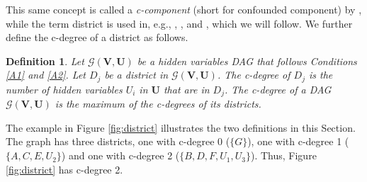 \documentclass[12pt]{article}
\newtheorem{definition}{Definition}
\newcommand{\bU}{\boldsymbol{U}}
\newcommand{\bV}{\boldsymbol{V}}
\begin{document}
This same concept is called a \emph{c-component} (short for confounded component) by \citet{tian2002testable}, while the term district is used in, e.g., \citet{richardson2003admgs}, \citet{evans2018margins}, and \citet {duarte2023automated}, which we will follow. We further define the c-degree of a district as follows.


\begin{definition}\label{def:cdeg}
Let $\mathcal{G}(\bV, \bU)$ be a hidden variables DAG that follows Conditions \ref{A1} and \ref{A2}. Let $D_j$ be a district in $\mathcal{G}(\bV, \bU)$. The \emph{c-degree} of $D_j$ is the number of hidden variables $U_i$ in $\bU$ that are in $D_j$. The c-degree of a DAG $\mathcal{G}(\bV, \bU)$ is the maximum of the c-degrees of its districts. 
\end{definition}

The example in Figure \ref{fig:district} illustrates the two definitions in this Section. The graph has three districts, one with c-degree 0 ($\{G\}$), one with c-degree 1 ($\{A, C, E, U_2\}$) and one with c-degree 2 ($\{B, D, F, U_1, U_3\}$). Thus, Figure \ref{fig:district} has c-degree 2. 
\end{document}
